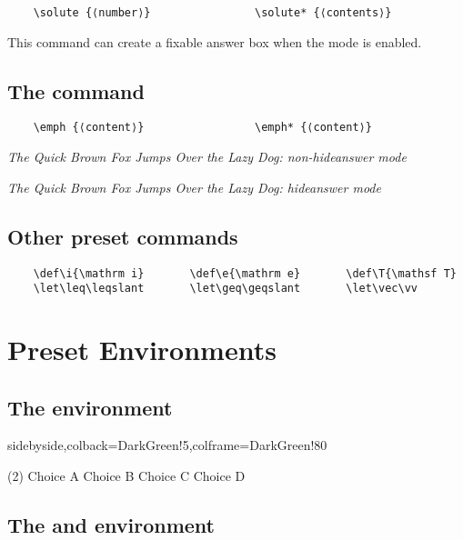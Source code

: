 \documentclass[mtpro2,twoside,openany]{litesolution}
\begin{document}
\begin{verbatim}
    \solute {⟨number⟩}                \solute* {⟨contents⟩}
\end{verbatim}

This command can create a fixable answer box when the mode  is enabled.

\subsection{The  command}

\begin{verbatim}
    \emph {⟨content⟩}                 \emph* {⟨content⟩}
\end{verbatim}

\emph{The Quick Brown Fox Jumps Over the Lazy Dog: non-hideanswer mode}

\emph*{The Quick Brown Fox Jumps Over the Lazy Dog: hideanswer mode}

\subsection{Other preset commands}

\begin{verbatim}
    \def\i{\mathrm i}       \def\e{\mathrm e}       \def\T{\mathsf T}
    \let\leq\leqslant       \let\geq\geqslant       \let\vec\vv
\end{verbatim}

\section{Preset  Environments}

\subsection{The  environment}

\begin{tcblisting}{sidebyside,colback=DarkGreen!5,colframe=DarkGreen!80}
\begin{problem}[Keywords]\leavevmode
\begin{tasks}(2)
  \task Choice A  \task[\true] Choice B
  \task Choice C  \task Choice D
\end{tasks}
\end{problem}
\end{tcblisting}

\subsection{The  and  environment}
\end{document}
